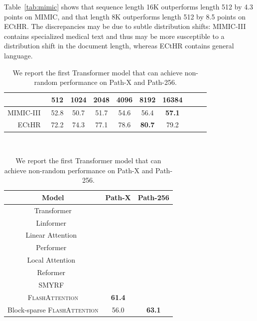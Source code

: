 \documentclass{article}
\newcommand{\xmark}{\ding{55}}
\newcommand{\sysname}{\textsc{FlashAttention}\xspace}
\begin{document}
Table~\ref{tab:mimic} shows that sequence length 16K outperforms length 512 by 4.3 points on MIMIC, and that  length 8K outperforms length 512 by 8.5 points on ECtHR.
The discrepancies may be due to subtle distribution shifts: MIMIC-III contains specialized medical text and thus may be more susceptible to a distribution shift in the document length, whereas ECtHR contains general language.

\vspace{-1em}
\begin{table}[h]
    \centering
    \begin{minipage}{2.5in}
\small
\captionsetup{font=small}
\caption{Long Document performance (micro $F_1$) at different sequence lengths using \sysname.}
\resizebox{1.05\linewidth}{!}
{
\begin{tabular}{@{}r|ccccccccc@{}}
 & 512 & 1024 & 2048 & 4096 & 8192 & 16384 \\
\hline
MIMIC-III~\citep{johnson2016mimic} & 52.8 & 50.7 & 51.7 & 54.6 & 56.4 & \textbf{57.1} \\
ECtHR~\citep{chalkidis-etal-2019-neural} & 72.2 & 74.3 & 77.1 & 78.6 & \textbf{80.7} & 79.2 \\
\end{tabular}
}
\label{tab:mimic}

    \end{minipage}
    \begin{minipage}{0.20in}
    ~
    \end{minipage}
    \begin{minipage}{2.5in}
\captionsetup{font=small}
    \caption{We report the first Transformer model that can achieve non-random performance on Path-X and Path-256.}
	\centering
	\small
  \resizebox{0.95\linewidth}{!}
  {
	\begin{tabular}{c|cc}
    {\bf Model}  & Path-X & Path-256 \\
	\hline
	Transformer& \xmark & \xmark \\
	Linformer~\citep{wang2020linformer}& \xmark & \xmark \\
	Linear Attention~\citep{katharopoulos2020transformers}& \xmark & \xmark \\
	Performer~\citep{choromanski2020rethinking}& \xmark & \xmark \\
	Local Attention~\citep{tay2020long} & \xmark & \xmark \\
	Reformer~\citep{kitaev2020reformer}& \xmark & \xmark \\
	SMYRF~\citep{daras2020smyrf}& \xmark & \xmark \\
	
    \hline
    \sysname & \textbf{61.4} & \xmark \\
    Block-sparse \sysname & 56.0 & \textbf{63.1} \\
	
	\end{tabular}
  }
	\label{table:pathx}

    \end{minipage}
\end{table}
\vspace{-1em}
\end{document}
